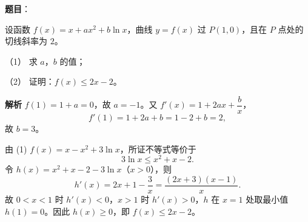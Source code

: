\begin{answer}

\textbf{题目}：

设函数 $f(x)=x+ax^2+b\ln x$，曲线 $y=f(x)$ 过 $P(1,0)$，且在 $P$ 点处的切线斜率为 $2$。

（1） 求 $a$，$b$ 的值；

（2） 证明：$f(x)\leqslant2x-2$。

\textbf{解析}
$f(1)=1+a=0$，故 $a=-1$。又 $f'(x)=1+2ax+\dfrac bx$，
\nopagebreak[4]
\[f'(1)=1+2a+b=1-2+b=2,\]
故 $b=3$。

由 (1) $f(x)=x-x^2+3\ln x$，所证不等式等价于
\nopagebreak[4]
\[3\ln x\leqslant x^2+x-2.\]
令 $h(x)=x^2+x-2-3\ln x$（$x>0$），则
\nopagebreak[4]
\[h'(x)=2x+1-\frac3x=\frac{(2x+3)(x-1)}x.\]
故 $0<x<1$ 时 $h'(x)<0$，$x>1$ 时 $h'(x)>0$，$h$ 在 $x=1$ 处取最小值 $h(1)=0$。因此 $h(x)\geqslant0$，即 $f(x)\leqslant2x-2$。



\end{answer}

